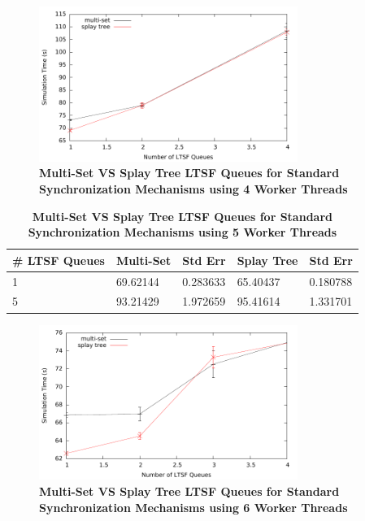\documentclass[11pt]{book}
\begin{document}
\begin{figure}
    \centering
    \graphicspath{ {./figures/} }
    \includegraphics[width=0.75\textwidth,keepaspectratio]{hugeepidemicsim-NOmig-timeVSschedQs-msVSst-4thread-std}
\caption{\textbf{Multi-Set VS Splay Tree LTSF Queues for Standard Synchronization
    Mechanisms using 4 Worker Threads}}\label{fig:noThrMig_timeVSschq_4threads_msVSst_std}
\end{figure}

\begin{table}
\centering
\begin{tabular}{l|p{2cm}|p{2cm}|p{2cm}|p{2cm}}
    \textbf{\# LTSF Queues}&Multi-Set &Std Err &Splay Tree &Std Err\\
    \hline
    \midrule
        1 &69.62144   &0.283633 &65.40437   &0.180788\\ 
        5 &93.21429   &1.972659 &95.41614   &1.331701\\
\end{tabular}
\caption{\textbf{Multi-Set VS Splay Tree LTSF Queues for Standard Synchronization
    Mechanisms using 5 Worker Threads}}\label{tab:noThrMig_5threadsXschq_msVSst_std}
\end{table}

\begin{figure}
    \centering
    \graphicspath{ {./figures/} }
    \includegraphics[width=0.75\textwidth,keepaspectratio]{hugeepidemicsim-NOmig-timeVSschedQs-msVSst-6thread-std}
\caption{\textbf{Multi-Set VS Splay Tree LTSF Queues for Standard Synchronization
    Mechanisms using 6 Worker Threads}}\label{fig:noThrMig_timeVSschq_6threads_msVSst_std}
\end{figure}
\end{document}

